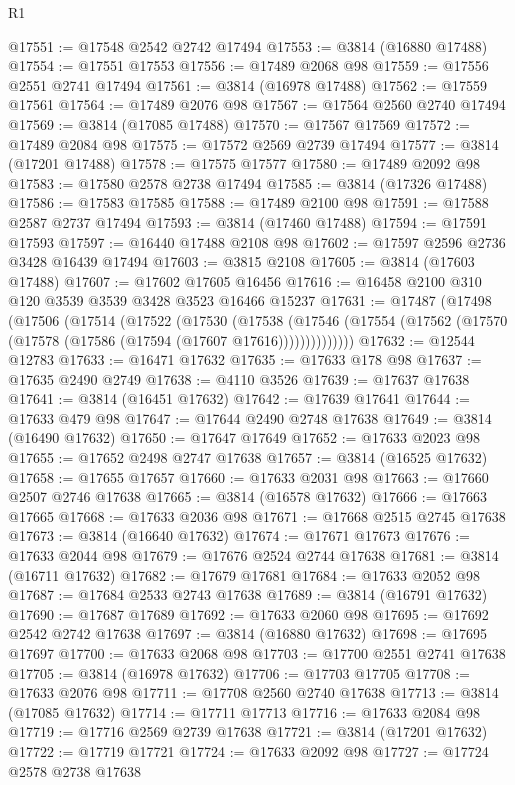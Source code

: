 \begin{lexlean}{R1}
\begin{coremodule}
@17551 := @17548 @2542 @2742 @17494
@17553 := @3814 (@16880 @17488)
@17554 := @17551 @17553
@17556 := @17489 @2068 @98
@17559 := @17556 @2551 @2741 @17494
@17561 := @3814 (@16978 @17488)
@17562 := @17559 @17561
@17564 := @17489 @2076 @98
@17567 := @17564 @2560 @2740 @17494
@17569 := @3814 (@17085 @17488)
@17570 := @17567 @17569
@17572 := @17489 @2084 @98
@17575 := @17572 @2569 @2739 @17494
@17577 := @3814 (@17201 @17488)
@17578 := @17575 @17577
@17580 := @17489 @2092 @98
@17583 := @17580 @2578 @2738 @17494
@17585 := @3814 (@17326 @17488)
@17586 := @17583 @17585
@17588 := @17489 @2100 @98
@17591 := @17588 @2587 @2737 @17494
@17593 := @3814 (@17460 @17488)
@17594 := @17591 @17593
@17597 := @16440 @17488 @2108 @98
@17602 := @17597 @2596 @2736 @3428 @16439 @17494
@17603 := @3815 @2108
@17605 := @3814 (@17603 @17488)
@17607 := @17602 @17605 @16456
@17616 := @16458 @2100 @310 @120 @3539 @3539 @3428 @3523 @16466 @15237
@17631 := @17487
    (@17498
      (@17506
        (@17514
          (@17522
            (@17530
              (@17538
                (@17546 (@17554 (@17562 (@17570 (@17578 (@17586 (@17594 (@17607 @17616))))))))))))))
@17632 := @12544 @12783
@17633 := @16471 @17632
@17635 := @17633 @178 @98
@17637 := @17635 @2490 @2749
@17638 := @4110 @3526
@17639 := @17637 @17638
@17641 := @3814 (@16451 @17632)
@17642 := @17639 @17641
@17644 := @17633 @479 @98
@17647 := @17644 @2490 @2748 @17638
@17649 := @3814 (@16490 @17632)
@17650 := @17647 @17649
@17652 := @17633 @2023 @98
@17655 := @17652 @2498 @2747 @17638
@17657 := @3814 (@16525 @17632)
@17658 := @17655 @17657
@17660 := @17633 @2031 @98
@17663 := @17660 @2507 @2746 @17638
@17665 := @3814 (@16578 @17632)
@17666 := @17663 @17665
@17668 := @17633 @2036 @98
@17671 := @17668 @2515 @2745 @17638
@17673 := @3814 (@16640 @17632)
@17674 := @17671 @17673
@17676 := @17633 @2044 @98
@17679 := @17676 @2524 @2744 @17638
@17681 := @3814 (@16711 @17632)
@17682 := @17679 @17681
@17684 := @17633 @2052 @98
@17687 := @17684 @2533 @2743 @17638
@17689 := @3814 (@16791 @17632)
@17690 := @17687 @17689
@17692 := @17633 @2060 @98
@17695 := @17692 @2542 @2742 @17638
@17697 := @3814 (@16880 @17632)
@17698 := @17695 @17697
@17700 := @17633 @2068 @98
@17703 := @17700 @2551 @2741 @17638
@17705 := @3814 (@16978 @17632)
@17706 := @17703 @17705
@17708 := @17633 @2076 @98
@17711 := @17708 @2560 @2740 @17638
@17713 := @3814 (@17085 @17632)
@17714 := @17711 @17713
@17716 := @17633 @2084 @98
@17719 := @17716 @2569 @2739 @17638
@17721 := @3814 (@17201 @17632)
@17722 := @17719 @17721
@17724 := @17633 @2092 @98
@17727 := @17724 @2578 @2738 @17638

\end{coremodule}
\end{lexlean}
